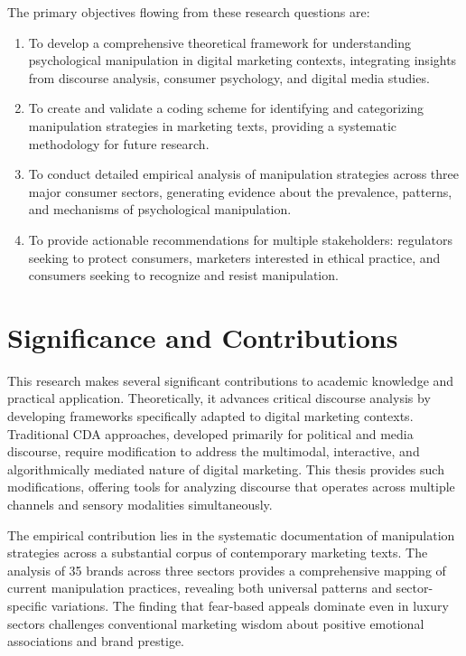The primary objectives flowing from these research questions are:

\begin{enumerate}
\item To develop a comprehensive theoretical framework for understanding psychological manipulation in digital marketing contexts, integrating insights from discourse analysis, consumer psychology, and digital media studies.

\item To create and validate a coding scheme for identifying and categorizing manipulation strategies in marketing texts, providing a systematic methodology for future research.

\item To conduct detailed empirical analysis of manipulation strategies across three major consumer sectors, generating evidence about the prevalence, patterns, and mechanisms of psychological manipulation.

\item To provide actionable recommendations for multiple stakeholders: regulators seeking to protect consumers, marketers interested in ethical practice, and consumers seeking to recognize and resist manipulation.
\end{enumerate}

\section{Significance and Contributions}
\label{sec:significance}

This research makes several significant contributions to academic knowledge and practical application. Theoretically, it advances critical discourse analysis by developing frameworks specifically adapted to digital marketing contexts. Traditional CDA approaches, developed primarily for political and media discourse, require modification to address the multimodal, interactive, and algorithmically mediated nature of digital marketing. This thesis provides such modifications, offering tools for analyzing discourse that operates across multiple channels and sensory modalities simultaneously.

The empirical contribution lies in the systematic documentation of manipulation strategies across a substantial corpus of contemporary marketing texts. The analysis of 35 brands across three sectors provides a comprehensive mapping of current manipulation practices, revealing both universal patterns and sector-specific variations. The finding that fear-based appeals dominate even in luxury sectors challenges conventional marketing wisdom about positive emotional associations and brand prestige.

